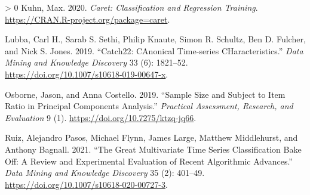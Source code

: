 \documentclass{article}
\newlength{\cslhangindent}
\newenvironment{CSLReferences}[3] %
 {%
  \setlength{\parindent}{0pt}
  \ifodd #1 \everypar{\setlength{\hangindent}{\cslhangindent}}\ignorespaces\fi
  \ifnum #2 > 0
  \setlength{\parskip}{#2\baselineskip}
  \fi
 }%
 {}
\begin{document}
\begin{CSLReferences}{1}{0}
\leavevmode\hypertarget{ref-caret}{}%
Kuhn, Max. 2020. \emph{Caret: Classification and Regression Training}.
\url{https://CRAN.R-project.org/package=caret}.

\leavevmode\hypertarget{ref-lubbaCatch22CAnonicalTimeseries2019}{}%
Lubba, Carl H., Sarab S. Sethi, Philip Knaute, Simon R. Schultz, Ben D.
Fulcher, and Nick S. Jones. 2019. {``Catch22: {CAnonical Time-series
CHaracteristics}.''} \emph{Data Mining and Knowledge Discovery} 33 (6):
1821--52. \url{https://doi.org/10.1007/s10618-019-00647-x}.

\leavevmode\hypertarget{ref-osborneSampleSizeSubject2019}{}%
Osborne, Jason, and Anna Costello. 2019. {``Sample Size and Subject to
Item Ratio in Principal Components Analysis.''} \emph{Practical
Assessment, Research, and Evaluation} 9 (1).
\url{https://doi.org/10.7275/ktzq-jq66}.

\leavevmode\hypertarget{ref-ruizGreatMultivariateTime2021}{}%
Ruiz, Alejandro Pasos, Michael Flynn, James Large, Matthew Middlehurst,
and Anthony Bagnall. 2021. {``The Great Multivariate Time Series
Classification Bake Off: A Review and Experimental Evaluation of Recent
Algorithmic Advances.''} \emph{Data Mining and Knowledge Discovery} 35
(2): 401--49. \url{https://doi.org/10.1007/s10618-020-00727-3}.

\end{CSLReferences}



\end{document}
